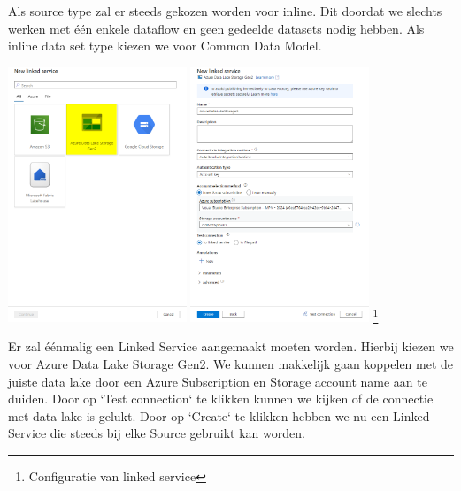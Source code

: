 Als source type zal er steeds gekozen worden voor inline. Dit doordat we slechts werken met één enkele dataflow en geen gedeelde datasets nodig hebben. Als inline data set type kiezen we voor Common Data Model.

\begin{center}%
    \centering
    \includegraphics[width=0.4\textwidth]{./graphics/adf/source_table_2_specific}
    \hspace{0.1\textwidth}
    \includegraphics[width=0.4\textwidth]{./graphics/adf/source_table_3_specific}
    \footnote{Configuratie van linked service}
\end{center}

Er zal éénmalig een Linked Service aangemaakt moeten worden. Hierbij kiezen we voor Azure Data Lake Storage Gen2. We kunnen makkelijk gaan koppelen met de juiste data lake door een Azure Subscription en Storage account name aan te duiden. Door op `Test connection` te klikken kunnen we kijken of de connectie met data lake is gelukt. Door op `Create` te klikken hebben we nu een Linked Service die steeds bij elke Source gebruikt kan worden.

